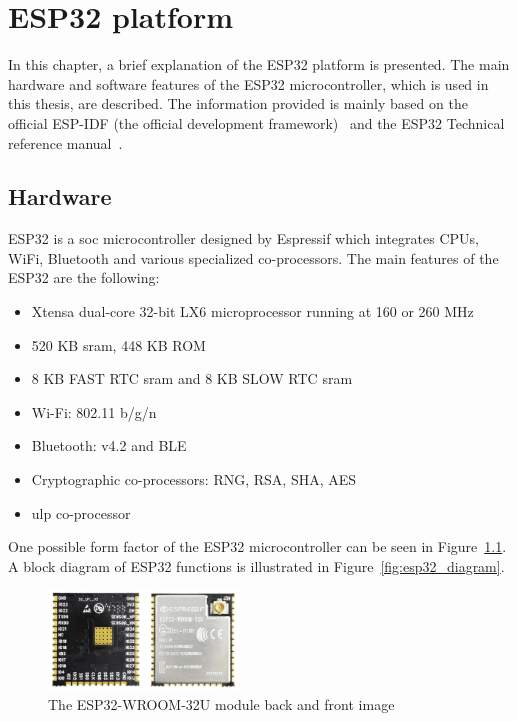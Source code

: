 \chapter{ESP32 platform}\label{sec:esp32}

In this chapter, a brief explanation of the ESP32 platform is presented. The main hardware and software features of the ESP32 microcontroller, which is used in this thesis, are described. The information provided is mainly based on the official ESP-IDF (the official development framework)~\cite{espidf2022} and the ESP32 Technical reference manual~\cite{esp322021}.

\section{Hardware}

ESP32 is a \gls{soc} microcontroller designed by Espressif which integrates CPUs, WiFi, Bluetooth and various specialized co-processors. The main features of the ESP32 are the following:

\begin{itemize}
    \item Xtensa dual-core 32-bit LX6 microprocessor running at 160 or 260 MHz
    \item 520 KB \gls{sram}, 448 KB ROM
    \item 8 KB FAST RTC \gls{sram} and 8 KB SLOW RTC \gls{sram}
    \item Wi-Fi: 802.11 b/g/n
    \item Bluetooth: v4.2 and BLE
    \item Cryptographic co-processors: RNG, RSA, SHA, AES
    \item \Gls{ulp} co-processor
\end{itemize}

One possible form factor of the ESP32 microcontroller can be seen in Figure~\ref{fig:esp32_wroom_module}. A block diagram of ESP32 functions is illustrated in Figure~\ref{fig:esp32_diagram}.

\begin{figure}[hb!]
    \centering
    \captionsetup{justification=centering,margin=0.5cm}
    \includegraphics[width=0.45\textwidth]{images/esp32_wroom_module.jpg}
    \caption[The ESP32-WROOM-32U module back and front image]{The ESP32-WROOM-32U module back and front image~\cite{SOSelectronic2018}}
    \label{fig:esp32_wroom_module}
\end{figure}

